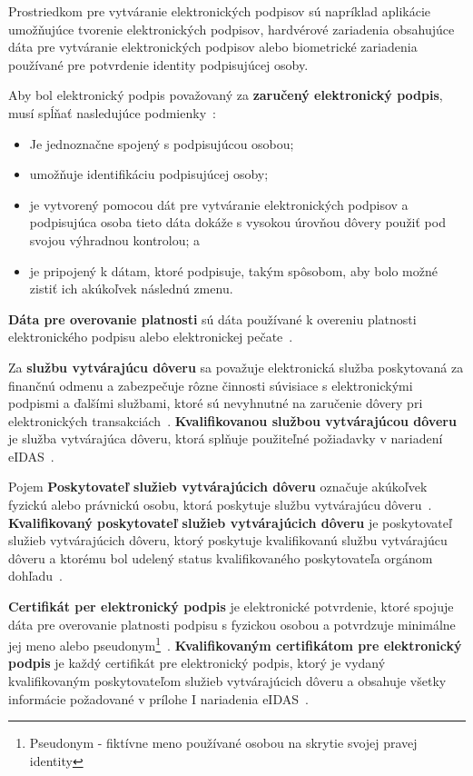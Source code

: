 \documentclass[
  digital,     %
  oneside,     %
  nosansbold,  %
  nocolorbold, %
  lof,         %
  nolot,         %
]{fithesis4}
\begin{document}
\noindent
Prostriedkom pre vytváranie elektronických podpisov sú napríklad aplikácie umožňujúce tvorenie elektronických podpisov, hardvérové zariadenia obsahujúce dáta pre vytváranie elektronických podpisov alebo biometrické zariadenia používané pre potvrdenie identity podpisujúcej osoby. 

Aby bol elektronický podpis považovaný za \textbf{zaručený elektronický podpis}, musí spĺňať nasledujúce podmienky~\cite[čl.~3,~odst.~11]{eidas2024}:

\begin{itemize}
    \item Je jednoznačne spojený s podpisujúcou osobou;
    \item umožňuje identifikáciu podpisujúcej osoby;
    \item je vytvorený pomocou dát pre vytváranie elektronických podpisov a podpisujúca osoba tieto dáta dokáže s vysokou úrovňou dôvery použiť pod svojou výhradnou kontrolou; a
    \item je pripojený k dátam, ktoré podpisuje, takým spôsobom, aby bolo možné zistiť ich akúkoľvek následnú zmenu.~\cite[čl.~26]{eidas2024}
\end{itemize}

\noindent
\textbf{Dáta pre overovanie platnosti} sú dáta používané k overeniu platnosti elektronického podpisu alebo elektronickej pečate~\cite[čl.~3,~odst.~40]{eidas2024}.

Za \textbf{službu vytvárajúcu dôveru} sa považuje elektronická služba poskytovaná za finančnú odmenu a zabezpečuje rôzne činnosti súvisiace s elektronickými podpismi a ďalšími službami, ktoré sú nevyhnutné na zaručenie dôvery pri elektronických transakciách~\cite[čl.~3,~odst.~16]{eidas2024}. \textbf{Kvalifikovanou službou vytvárajúcou dôveru} je služba vytvárajúca dôveru, ktorá splňuje použiteľné požiadavky v nariadení eIDAS~\cite[čl.~3,~odst.~17]{eidas2024}.

Pojem \textbf{Poskytovateľ služieb vytvárajúcich dôveru} označuje akúkoľvek fyzickú alebo právnickú osobu, ktorá poskytuje službu vytvárajúcu dôveru~\cite[čl.~3,~odst.~19]{eidas2024}. \textbf{Kvalifikovaný poskytovateľ služieb vytvárajúcich dôveru} je poskytovateľ služieb vytvárajúcich dôveru, ktorý poskytuje kvalifikovanú službu vytvárajúcu dôveru a ktorému bol udelený status kvalifikovaného poskytovateľa orgánom dohľadu~\cite[čl.~3,~odst.~20]{eidas2024}.

\textbf{Certifikát per elektronický podpis} je elektronické potvrdenie, ktoré spojuje dáta pre overovanie platnosti podpisu s fyzickou osobou a potvrdzuje minimálne jej meno alebo pseudonym\footnote{Pseudonym - fiktívne meno používané osobou na skrytie svojej pravej identity}~\cite[čl.~3,~odst.~14]{eidas2024}. \textbf{Kvalifikovaným certifikátom pre elektronický podpis} je každý certifikát pre elektronický podpis, ktorý je vydaný kvalifikovaným poskytovateľom služieb vytvárajúcich dôveru a obsahuje všetky informácie požadované v prílohe I nariadenia eIDAS~\cites[čl.~3,~odst.~15]{eidas2024}[príloha I]{eidas2024}.
\end{document}
